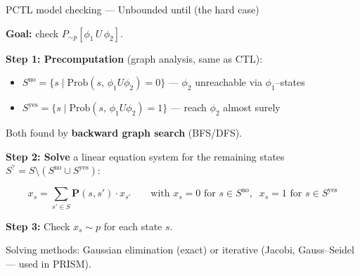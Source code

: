 \documentclass[dvipsnames]{beamer}
\begin{document}
\begin{frame}{PCTL model checking --- Unbounded until (the hard case)}

    \textbf{Goal:} check $P_{\sim p}[\phi_1 \, U\, \phi_2]$.

    \vspace{0.5em}

    \textbf{Step 1: Precomputation} (graph analysis, same as CTL):

    \begin{itemize}
        \item $S^{\text{no}} = \{s \mid \mathrm{Prob}(s,\, \phi_1 U \phi_2) = 0\}$
              \;---\; $\phi_2$ unreachable via $\phi_1$--states
        \item $S^{\text{yes}} = \{s \mid \mathrm{Prob}(s,\, \phi_1 U \phi_2) = 1\}$
              \;---\; reach $\phi_2$ almost surely
    \end{itemize}

    Both found by \textbf{backward graph search} (BFS/DFS).

    \vspace{0.8em}

    \textbf{Step 2: Solve} a linear equation system for the remaining states
    $S^{?} = S \setminus (S^{\text{no}} \cup S^{\text{yes}})$:

\end{frame}

\begin{frame}{}
    \begin{center}
        \[
            \boxed{
                x_s = \sum_{s' \in S} \mathbf{P}(s, s') \cdot x_{s'}
                \qquad \text{with } x_s = 0 \text{ for } s \in S^{\text{no}},\;\;
                x_s = 1 \text{ for } s \in S^{\text{yes}}
            }
        \]
    \end{center}

    \vspace{0.5em}

    \textbf{Step 3:} Check $x_s \sim p$ for each state $s$.

    \vspace{0.5em}
    {\footnotesize
        Solving methods: Gaussian elimination (exact)
        or iterative (Jacobi, Gauss--Seidel --- used in PRISM).
    }
\end{frame}
\end{document}
